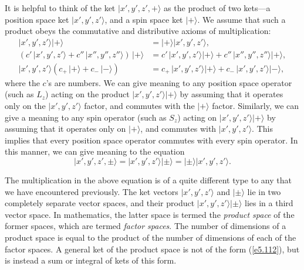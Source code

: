 It is helpful to think of the ket $|x', y', z', +\rangle$ as the product
of two kets---a position space ket $|x', y', z'\rangle$, and
a spin space ket $|+\rangle$. We assume that such a product obeys
the commutative and distributive axioms of multiplication:
\begin{align}
|x', y', z'\rangle |+\rangle &= |+\rangle |x', y', z'\rangle,\\[0.5ex]
\left(c'\, |x', y', z'\rangle + c''\,| x'', y'', z''\rangle\right)\,
|+\rangle &= c'\, |x', y', z'\rangle |+\rangle+ c'' \,|x'', y'', z''\rangle |+\rangle,
\\[0.5ex]
|x', y', z'\rangle\left(c_+ \,|+\rangle + c_-\, |-\rangle\right)&= c_+ \,
|x', y', z'\rangle|+\rangle+ c_-\,|x', y', z'\rangle|-\rangle,
\end{align}
where the $c$'s are numbers. We can give meaning to any
position space operator (such as $L_z$)  acting on the product $|x', y', z'\rangle
|+\rangle$ by assuming that it operates only on the $|x', y', z'\rangle$
factor, and commutes with the $|+\rangle$ factor. 
Similarly, we can give a meaning to any spin operator  (such as $S_z$) acting
on $|x', y', z'\rangle
|+\rangle$ by assuming that it operates only on $|+\rangle$, and
commutes with $|x', y', z'\rangle$. This implies that every position
space operator
commutes with every spin operator. In this manner, we can give
meaning to the equation
\begin{equation}\label{e5.112}
 |x', y', z', \pm\rangle = |x', y', z'\rangle| \pm\rangle = | \pm\rangle
|x', y', z'\rangle.
\end{equation}

The multiplication in the above equation is of  a quite different type to
any that we have encountered previously. The ket vectors $|x',y', z'\rangle$ and
$|\pm\rangle$ lie in two completely separate vector spaces, and their product
$|x',y', z'\rangle|\pm\rangle$ lies in a third vector space. 
In mathematics, the latter space
is termed the {\em product space}\/ of the former spaces, which are
termed {\em factor spaces}.  The number of
dimensions of a product space is equal to the product of the number of dimensions
of each of the factor spaces. A general ket of the product space is not
of the form (\ref{e5.112}), but is instead a sum or integral of kets of this form. 

